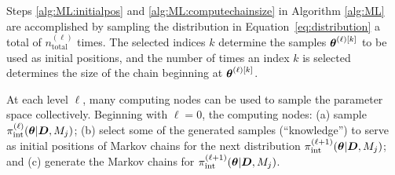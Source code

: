 % 
%  
% 

Steps \ref{alg:ML:initialpos} and \ref{alg:ML:computechainsize} in Algorithm
\ref{alg:ML} are accomplished by sampling the distribution in
Equation~\eqref{eq:distribution} a total of $n_\text{total}^{(\ell)} $ times.
The selected indices $k$ determine the samples $\mbox{\boldmath$ \theta $}^{(\ell) [k]}$ to be
used as initial positions, and the number of times an index $k$ is selected
determines the size of the chain beginning at $\mbox{\boldmath$ \theta $}^{(\ell) [k]}$.


At each level $\ell$, many computing nodes can be used to sample the parameter
space collectively. Beginning with $\ell = 0$, the computing nodes:
(a) sample $\pi_\text{int}^{(\ell)}(\mbox{\boldmath$ \theta $}|\mbox{\boldmath$ D $}, M_j)$; 
(b) select some of the generated samples (``knowledge'') to serve as initial positions of Markov chains for the next distribution $\pi_\text{int}^{(\ell+1)}(\mbox{\boldmath$ \theta $}|\mbox{\boldmath$ D $}, M_j)$; and 
(c) generate the Markov chains for $\pi_\text{int}^{(\ell+1)}(\mbox{\boldmath$ \theta $}|\mbox{\boldmath$ D $}, M_j)$. 

